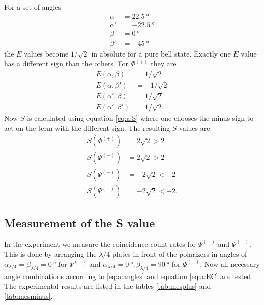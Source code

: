 For a set of angles
\begin{subequations}
\label{eq:a:angles}
\begin{align}
\alpha&=\SI{22.5}{\degree}\label{eq:a:angles:a}\\
\alpha'&=\SI{-22.5}{\degree}\label{eq:a:angles:a'}\\
\beta&=\SI{0}{\degree}\label{eq:a:angles:b}\\
\beta'&=\SI{-45}{\degree}\label{eq:a:angles:b'}
\end{align}
\end{subequations}
the $E$ values become $1/\sqrt{2}$ in absolute for a pure bell state.
Exactly one $E$ value has a different sign than the others.
For $\Phi^{(+)}$ they are
\begin{subequations}
\label{eq:a:Ebell}
\begin{align}
    E(\alpha,\beta)&=1/\sqrt{2}\label{eq:a:Ebell:ab}\\
    E(\alpha,\beta')&=-1/\sqrt{2}\label{eq:a:Ebell:abs}\\
    E(\alpha',\beta)&=1/\sqrt{2}\label{eq:a:Ebell:asb}\\
    E(\alpha',\beta')&=1/\sqrt{2}.\label{eq:a:Ebell:asbs}
\end{align}
\end{subequations}
Now $S$ is calculated using equation \eqref{eq:a:S} where one chooses the minus sign to act on the term with the different sign.
The resulting $S$ values are
\begin{subequations}
\label{eq:a:Sbell}
\begin{align}
S(\Phi^{(+)})&=2\sqrt{2}>2\label{eq:a:Sbell:phi+}\\
S(\Phi^{(-)})&=2\sqrt{2}>2\label{eq:a:Sbell:phi-}\\
S(\Psi^{(+)})&=-2\sqrt{2}<-2\label{eq:a:Sbell:psi+}\\
S(\Psi^{(-)})&=-2\sqrt{2}<-2.\label{eq:a:Sbell:psi-}
\end{align}
\end{subequations}

\subsection{Measurement of the S value}
In the experiment we measure the coincidence count rates for $\Psi^{(+)}$ and $\Psi^{(-)}$.
This is done by arranging the $\lambda/4$-plates in front of the polarizers in angles of $\alpha_{\lambda/4}=\beta_{\lambda/4}=\SI{0}{\degree}$ for $\Psi^{(+)}$ and $\alpha_{\lambda/4}=\SI{0}{\degree},\beta_{\lambda/4}=\SI{90}{\degree}$ for $\Psi^{(-)}$.
Now all necessary angle combinations according to \eqref{eq:a:angles} and equation \eqref{eq:a:EC} are tested.
The experimental results are listed in the tables \vref{tab:mesplus} and \vref{tab:mesminus}.

